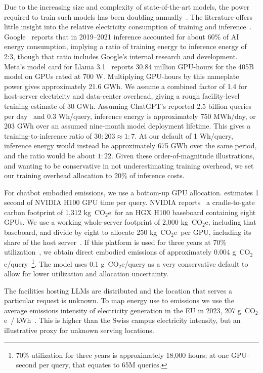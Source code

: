 \documentclass[11pt]{article}
\let\cite\parencite
\newcommand{\coe}{CO$_2$e}
\newcommand{\gcoe}{g~\coe}
\newcommand{\kgcoe}{k\gcoe}
\newcommand{\gcoekwh}{\gcoe\ / kWh}
\begin{document}
Due to the increasing size and complexity of state-of-the-art models, the power
required to train such models has been doubling
annually~\cite{epoch2024powerusagetrend}. The literature offers little insight
into the relative electricity consumption of training and
inference~\cite{verdecchia2023systematic}.
Google~\cite{patterson:footprint:2022} reports that in 2019--2021 inference
accounted for about 60\% of AI energy consumption, implying a ratio of training
energy to inference energy of 2:3, though that ratio includes Google's internal
research and development. Meta's model card for Llama
3.1~\cite{meta:llama31:modelcard} reports 30.84 million GPU-hours for the 405B
model on GPUs rated at 700 W. Multiplying GPU-hours by this nameplate power
gives approximately 21.6 GWh. We assume a combined factor of 1.4 for host-server
electricity and data-center overhead, giving a rough facility-level training
estimate of 30 GWh. Assuming ChatGPT's reported 2.5 billion queries per
day~\cite{techcrunch:chatgpt} and 0.3 Wh/query, inference energy is
approximately 750 MWh/day, or 203 GWh over an assumed nine-month model
deployment lifetime. This gives a training-to-inference ratio of $30:203 \approx
1:7$. At our default of 1 Wh/query, inference energy would instead be
approximately 675 GWh over the same period, and the ratio would be about $1:22$.
Given these order-of-magnitude illustrations, and wanting to be conservative in
not underestimating training overhead, we set our training overhead allocation
to 20\% of inference costs.

For chatbot embodied emissions, we use a bottom-up GPU allocation.
\textcite{epoch2025howmuchenergydoeschatgptuse} estimates 1 second of NVIDIA
H100 GPU time per query. NVIDIA reports~\cite{nvidia:h100} a cradle-to-gate
carbon footprint of 1,312 \kgcoe\ for an HGX H100 baseboard containing eight
GPUs. We use a working whole-server footprint of 2,000 \kgcoe, including that
baseboard, and divide by eight to allocate 250 \kgcoe\ per GPU, including its
share of the host server~\cite{nvidia:dgx}. If this platform is used for three
years at 70\% utilization~\cite{tomshardware:2024}, we obtain direct embodied
emissions of approximately 0.004 \gcoe/query~\footnote{70\% utilization for
three years is approximately 18,000 hours; at one GPU-second per query, that
equates to 65M queries.}. The model uses 0.1 \gcoe/query as a very conservative
default to allow for lower utilization and allocation uncertainty.

The facilities hosting LLMs are distributed and the location that serves a
particular request is unknown. To map energy use to emissions we use the average
emissions intensity of electricity generation in the EU in 2023, 207
\gcoekwh~\cite{eea:emissions:2025}. This is higher than the Swiss campus
electricity intensity, but an illustrative proxy for unknown serving locations.
\end{document}
